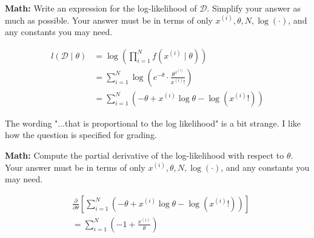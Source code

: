 \begin{parts}
\begin{subparts}
    \subpart[2] \textbf{Math:} Write an expression for the log-likelihood of $\mathcal{D}$. Simplify your answer as much as possible. Your answer must be in terms of only $x^{(i)}, \theta, N, \log(\cdot)$, and any constants you may need. 
    \begin{tcolorbox}[fit,height=4.5cm, width=15cm, blank, borderline={1pt}{-2pt}]
        \begin{soln} 
        \begin{align*}
            l(\mathcal{D} \mid \theta) &= \log\left(\prod_{i=1}^N f(x^{(i)} \mid \theta)\right)\\
            &= \sum_{i=1}^N \log\left(e^{-\theta} \cdot \frac{\theta^{x^{(i)}}}{x^{(i)} !} \right)\\
            &= \sum_{i=1}^N \left(-\theta + x^{(i)}\log\theta - \log(x^{(i)}!) \right)
        \end{align*}
        \end{soln}
    \end{tcolorbox}
    \begin{qtester}
        The wording "...that is proportional to the log likelihood" is a bit strange. I like how the question is specified for grading.
    \end{qtester}
        
    \subpart[2] \textbf{Math:} Compute the partial derivative of the log-likelihood with respect to  $\theta$. Your answer must be in terms of only $x^{(i)}, \theta, N, \log(\cdot)$, and any constants you may need. 
    \begin{tcolorbox}[fit,height=4cm, width=15cm, blank, borderline={1pt}{-2pt}]
        \begin{soln}
        \begin{align*}
            &\frac{\partial}{\partial\theta} \left[ \sum_{i=1}^N \left(-\theta + x^{(i)}\log\theta - \log(x^{(i)}!) \right)\right]\\
            &= \sum_{i=1}^N (-1 + \frac{x^{(i)}}{\theta})
        \end{align*}
        \end{soln}
    \end{tcolorbox}
    

\end{subparts}
\end{parts}
